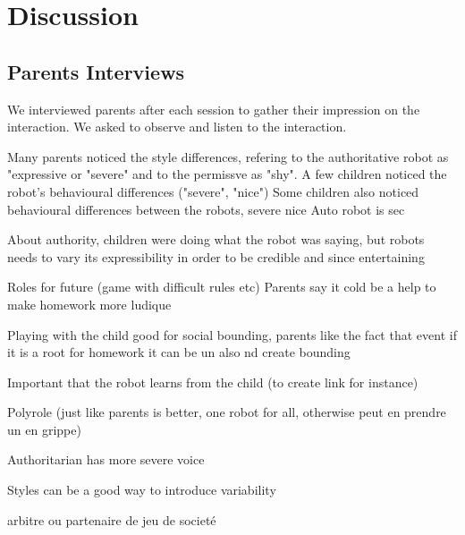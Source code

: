 \section{Discussion}
\label{sec:discussion}
\subsection{Parents Interviews}
We interviewed parents after each session to gather their impression on the interaction. We asked to observe and listen to the interaction.

Many parents noticed the style differences, refering to the authoritative robot as "expressive or "severe" and to the permissve as "shy". 
A few children noticed the robot's behavioural differences ("severe", "nice")
Some children also noticed behavioural differences between the robots, severe nice 
Auto robot is sec 

About authority, children were doing what the robot was saying, but robots needs to vary its expressibility in order to be credible and since entertaining


Roles for future (game with difficult rules etc)
Parents say it cold be a help to make homework more ludique

Playing with the child good for social bounding, parents like the fact that event if it is a root for homework it can be un also nd create bounding

Important that the robot learns from the child (to create link for instance)

Polyrole (just like parents is better, one robot for all, otherwise peut en prendre un en grippe)

Authoritarian has more severe voice

Styles can be a good way to introduce variability

arbitre ou partenaire de jeu de societé